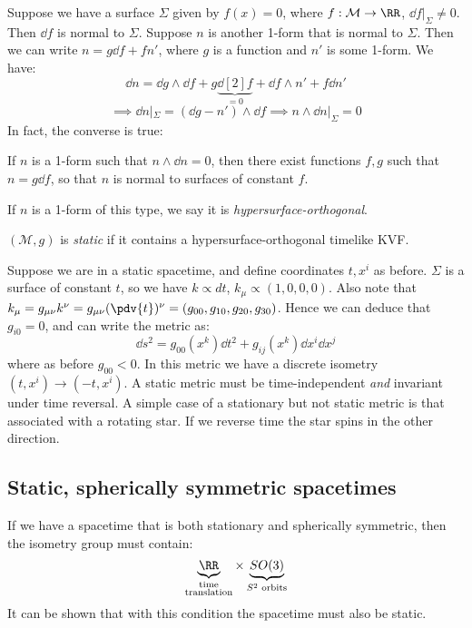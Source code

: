 \documentclass{jknotes}
\begin{document}
Suppose we have a surface \(\Sigma\) given by \(f(x)=0\), where \(f:\mathcal{M}\rightarrow\RR\), \(\dd{f}|_\Sigma\ne0\). Then \(\dd{f}\) is normal to \(\Sigma\). Suppose \(n\) is another 1-form that is normal to \(\Sigma\). Then we can write \(n=g\dd{f}+fn'\), where \(g\) is a function and \(n'\) is some 1-form. We have:
\begin{equation}
    \dd{n} = \dd{g}\wedge\dd{f}+g\underbrace{\dd[2]{f}}_{=0} + \dd{f}\wedge n' + f\dd{n'}
\end{equation}
\begin{equation}
    \implies \dd{n}|_\Sigma = (\dd{g}-n')\wedge\dd{f} \implies n\wedge \dd{n}|_\Sigma = 0
\end{equation}
In fact, the converse is true:
\begin{theorem}[Frobenius]
    If \(n\) is a 1-form such that \(n\wedge \dd{n}=0\), then there exist functions \(f,g\) such that \(n=g\dd{f}\), so that \(n\) is normal to surfaces of constant \(f\).
\end{theorem}
If \(n\) is a 1-form of this type, we say it is \emph{hypersurface-orthogonal}.

\begin{defn}
    \((\mathcal{M},g)\) is \emph{static} if it contains a hypersurface-orthogonal timelike KVF.
\end{defn}

Suppose we are in a static spacetime, and define coordinates \(t,x^i\) as before. \(\Sigma\) is a surface of constant \(t\), so we have \(k \propto dt\), \(k_\mu \propto (1,0,0,0)\). Also note that \(k_\mu = g_{\mu\nu}k^\nu = g_{\mu\nu}(\pdv{t})^\nu = (g_{00},g_{10},g_{20},g_{30})\). Hence we can deduce that \(g_{i0}=0\), and can write the metric as:
\begin{equation}
    \dd{s}^2 = g_{00}(x^k) \dd{t}^2 + g_{ij}(x^k)\dd{x^i}\dd{x^j}
\end{equation}
where as before \(g_{00}<0\). In this metric we have a discrete isometry \((t,x^i) \rightarrow (-t,x^i)\). A static metric must be time-independent \emph{and} invariant under time reversal. A simple case of a stationary but not static metric is that associated with a rotating star. If we reverse time the star spins in the other direction.

\subsection{Static, spherically symmetric spacetimes}
If we have a spacetime that is both stationary and spherically symmetric, then the isometry group must contain:
\begin{equation}
    \underbrace{\RR}_{\substack{\text{time}\\\text{translation}}} \times \underbrace{SO(3)}_{S^2 \text{ orbits}}
\end{equation}
It can be shown that with this condition the spacetime must also be static.
\end{document}
